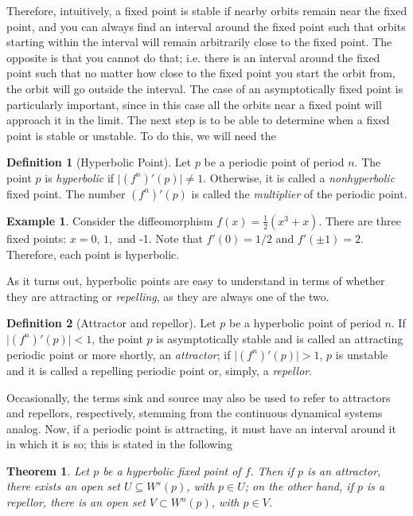\documentclass[10pt,twoside,titlepage]{book}
\numberwithin{equation}{chapter}
\numberwithin{figure}{chapter}
\numberwithin{table}{chapter}
\theoremstyle{plain}%
\newtheorem{thm}{Theorem}[chapter]
\theoremstyle{definition}
\newtheorem{defn}{Definition}[chapter]
\newtheorem{example}{Example}[chapter]
\theoremstyle{remark}
\begin{document}
Therefore, intuitively, a fixed point is stable if nearby orbits remain near the fixed point, and you can always find an interval around the fixed point such that orbits starting within the interval will remain arbitrarily close to the fixed point. The opposite is that you cannot do that; i.e. there is an interval around the fixed point such that no matter how close to the fixed point you start the orbit from, the orbit will go outside the interval. The case of an asymptotically fixed point is particularly important, since in this case all the orbits near a fixed point will approach it in the limit. The next step is to be able to determine when a fixed point is stable or unstable. To do this, we will need the

\begin{defn}[Hyperbolic Point]
	\label{def:hyperbolic-fp}
	Let $p$ be a periodic point of period $n$. The point $p$ is \emph{hyperbolic} if $\vert(f^{n})'(p)\vert\neq1$. Otherwise, it is called a \emph{nonhyperbolic} fixed point. The number $(f^{n})'(p)$ is called the \emph{multiplier} of the periodic point.
\end{defn}

\begin{example}
	Consider the diffeomorphism $f(x)=\frac{1}{2}(x^{3}+x)$. There are three fixed points: $x=0,\,1,$ and -1. Note that $f'(0)=1/2$ and $f'(\pm1)=2$. Therefore, each point is hyperbolic.
\end{example}

As it turns out, hyperbolic points are easy to understand in terms of whether they are attracting or \emph{repelling}, as they are always one of the two.

\begin{defn}[Attractor and repellor]
	\label{def:attractor-repellor}
	Let $p$ be a hyperbolic point of period $n$. If $\vert(f^{n})'(p)\vert<1$, the point $p$ is asymptotically stable and is called an attracting periodic point or more shortly, an \emph{attractor}; if $\vert(f^{n})'(p)\vert>1$, $p$ is unstable and it is called a repelling periodic point or, simply, a \emph{repellor}.
\end{defn}

Occasionally, the terms sink and source may also be used to refer to attractors and repellors, respectively, stemming from the continuous dynamical systems analog. Now, if a periodic point is attracting, it must have an interval around it in which it is so; this is stated in the following

\begin{thm}\label{thm:attractor-repellor}
	Let $p$ be a hyperbolic fixed point of $f$. Then if $p$ is an attractor, there exists an open set $U\subseteq W^{s}(p)$, with $p\in U$; on the other hand, if $p$ is a repellor, there is an open set $V\subset W^{u}(p)$, with $p\in V$.
\end{thm}
\end{document}
